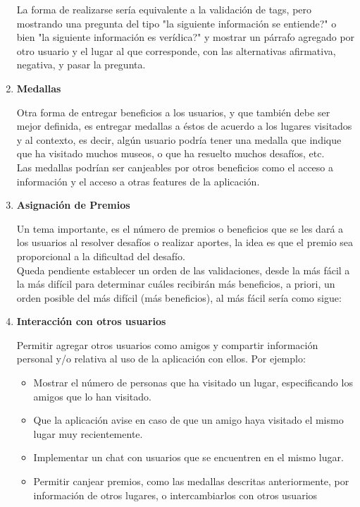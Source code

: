 \documentclass[10pt,letterpaper]{article}
\begin{document}
\begin{enumerate}
La forma de realizarse sería equivalente a la validación de tags, pero mostrando una pregunta del tipo "la siguiente información se entiende?" o bien "la siguiente información es verídica?" y mostrar un párrafo agregado por otro usuario y el lugar al que corresponde, con las alternativas afirmativa, negativa, y pasar la pregunta.\\

\item \textbf{Medallas}

Otra forma de entregar beneficios a los usuarios, y que también debe ser mejor definida, es entregar medallas a éstos de acuerdo a los lugares visitados y al contexto, es decir, algún usuario podría tener una medalla que indique que ha visitado muchos museos, o que ha resuelto muchos desafíos, etc.\\

Las medallas podrían ser canjeables por otros beneficios como el acceso a información y el acceso a otras features de la aplicación.\\

\item \textbf{Asignación de Premios}

Un tema importante, es el número de premios o beneficios que se les dará a los usuarios al resolver desafíos o realizar aportes, la idea es que el premio sea proporcional a la dificultad del desafío.\\

Queda pendiente establecer un orden de las validaciones, desde la más fácil a la más difícil para determinar cuáles recibirán más beneficios, a priori, un orden posible del más difícil (más beneficios), al más fácil sería como sigue:\\

\item \textbf{Interacción con otros usuarios}

Permitir agregar otros usuarios como amigos y compartir información personal y/o relativa al uso de la aplicación con ellos. Por ejemplo:

\begin{itemize}

\item Mostrar el número de personas que ha visitado un lugar, especificando los amigos que lo han visitado.
\item Que la aplicación avise en caso de que un amigo haya visitado el mismo lugar muy recientemente.
\item Implementar un chat con usuarios que se encuentren en el mismo lugar.
\item Permitir canjear premios, como las medallas descritas anteriormente, por información de otros lugares, o intercambiarlos con otros usuarios


\end{itemize}
\end{enumerate}
\end{document}
